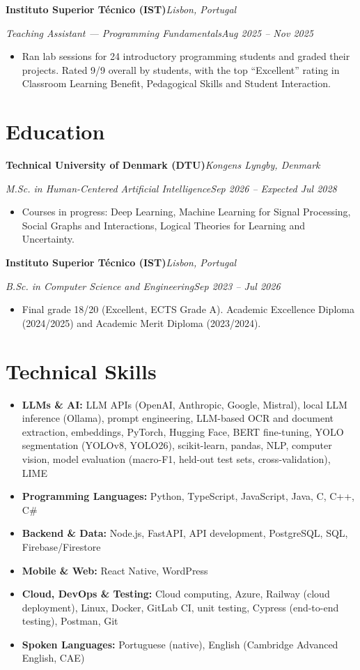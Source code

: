 \documentclass[11pt,a4paper]{article}
\newcommand{\entry}[2]{\Needspace{5\baselineskip}\textbf{#1}\hfill\textit{#2}\par\nopagebreak}
\newcommand{\role}[2]{\textit{#1}\hfill\textit{#2}\par\nopagebreak}
\begin{document}
\entry{Instituto Superior Técnico (IST)}{Lisbon, Portugal}
\role{Teaching Assistant --- Programming Fundamentals}{Aug 2025 -- Nov 2025}
\begin{itemize}
    \item Ran lab sessions for 24 introductory programming students and graded their projects. Rated 9/9 overall by students, with the top ``Excellent'' rating in Classroom Learning Benefit, Pedagogical Skills and Student Interaction.
\end{itemize}

\section*{Education}
\entry{Technical University of Denmark (DTU)}{Kongens Lyngby, Denmark}
\role{M.Sc. in Human-Centered Artificial Intelligence}{Sep 2026 -- Expected Jul 2028}
\begin{itemize}
    \item Courses in progress: Deep Learning, Machine Learning for Signal Processing, Social Graphs and Interactions, Logical Theories for Learning and Uncertainty.
\end{itemize}

\entry{Instituto Superior Técnico (IST)}{Lisbon, Portugal}
\role{B.Sc. in Computer Science and Engineering}{Sep 2023 -- Jul 2026}
\begin{itemize}
    \item Final grade 18/20 (Excellent, ECTS Grade A). Academic Excellence Diploma (2024/2025) and Academic Merit Diploma (2023/2024).
\end{itemize}

\section*{Technical Skills}
\begin{itemize}
    \item \textbf{LLMs \& AI:} LLM APIs (OpenAI, Anthropic, Google, Mistral), local LLM inference (Ollama), prompt engineering, LLM-based OCR and document extraction, embeddings, PyTorch, Hugging Face, BERT fine-tuning, YOLO segmentation (YOLOv8, YOLO26), scikit-learn, pandas, NLP, computer vision, model evaluation (macro-F1, held-out test sets, cross-validation), LIME
    \item \textbf{Programming Languages:} Python, TypeScript, JavaScript, Java, C, C++, C\#
    \item \textbf{Backend \& Data:} Node.js, FastAPI, API development, PostgreSQL, SQL, Firebase/Firestore
    \item \textbf{Mobile \& Web:} React Native, WordPress
    \item \textbf{Cloud, DevOps \& Testing:} Cloud computing, Azure, Railway (cloud deployment), Linux, Docker, GitLab CI, unit testing, Cypress (end-to-end testing), Postman, Git
    \item \textbf{Spoken Languages:} Portuguese (native), English (Cambridge Advanced English, CAE)
\end{itemize}
\end{document}
